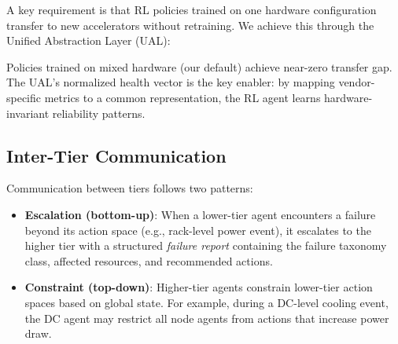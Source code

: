 \documentclass[conference,10pt,letterpaper]{IEEEtran}
\begin{document}
A key requirement is that RL policies trained on one hardware configuration transfer to new accelerators without retraining. We achieve this through the Unified Abstraction Layer (UAL):

\begin{table}[!t]
\caption{Policy Transfer Evaluation (Zero-Shot)}
\label{tab:transfer}
\centering\scriptsize
{}
\end{table}

Policies trained on mixed hardware (our default) achieve near-zero transfer gap. The UAL's normalized health vector is the key enabler: by mapping vendor-specific metrics to a common representation, the RL agent learns hardware-invariant reliability patterns.

\subsection{Inter-Tier Communication}

Communication between tiers follows two patterns:
\begin{itemize}
\item \textbf{Escalation (bottom-up)}: When a lower-tier agent encounters a failure beyond its action space (e.g., rack-level power event), it escalates to the higher tier with a structured \emph{failure report} containing the failure taxonomy class, affected resources, and recommended actions.
\item \textbf{Constraint (top-down)}: Higher-tier agents constrain lower-tier action spaces based on global state. For example, during a DC-level cooling event, the DC agent may restrict all node agents from actions that increase power draw.
\end{itemize}
\end{document}
